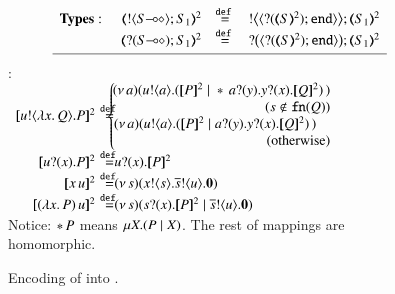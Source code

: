 \begin{figure}[t]
\[
\begin{array}{l}
	\begin{array}{rcl}
\noindent{\bf Types:}\hspace{0.5cm} 
		\tmap{\btout{\lhot{S}}S_1}{2} & \defeq & \bbtout{\chtype{\btinp{\tmap{S}{2}}\tinact}}\tmap{S_1}{2} \\
		\tmap{\btinp{\lhot{S}}S_1}{2} & \defeq & \bbtinp{\chtype{\btinp{\tmap{S}{2}}\tinact}}\tmap{S_1}{2} 
\\[1mm]
\hline
\end{array}
\end{array}
\]
\hspace{4mm}{\bf Terms} :\\
\noi$
\begin{array}{rcll}
		\pmap{\bout{u}{\abs{x}{Q}} P}{2} &\!\!\!\! \defeq \!\!\!\!\!\!\!\!&\!\!\!  \left\{
		\begin{array}{r}
		\!\!\!\!	\newsp{a}{\bout{u}{a} (\pmap{P}{2} \Par \repl{} \binp{a}{y} \binp{y}{x} \pmap{Q}{2})\,}\\
                  (s \notin \fn{Q}) \\
		\!\!\!\!	\newsp{a}{\bout{u}{a} (\pmap{P}{2} \Par \binp{a}{y} \binp{y}{x} \pmap{Q}{2})\,}\quad\\
            \textrm{(otherwise)} %
		\end{array}
		\right.
		\\
\pmap{\binp{u}{x} P}{2} &\!\!\!\! \defeq \!\!\!\! \!\!\!\! &  \binp{u}{x} \pmap{P}{2}
\\
\pmap{\appl{x}{u}}{2} & \!\!\!\! \defeq \!\!\!\! \!\!\!\! & \newsp{s}{\bout{x}{s} \bout{\dual{s}}{u} \inact} \\
\pmap{\appl{(\abs{x}{P})}{u}}{2} & \!\!\!\! \defeq \!\!\!\! \!\!\!\! & %
\newsp{s}{\binp{s}{x} \pmap{P}{2} \Par \bout{\dual{s}}{u} \inact}
	\end{array}
$\\[3mm]
{\small Notice: $\ast\,{} P$ means $\mu X. (P \;|\; X)$.
The rest of mappings are homomorphic.}\\ 
	\caption{
Encoding of \HOp into \sessp.
\label{f:enc:ho_to_sessp}
}
\Hlinefig
\end{figure}

